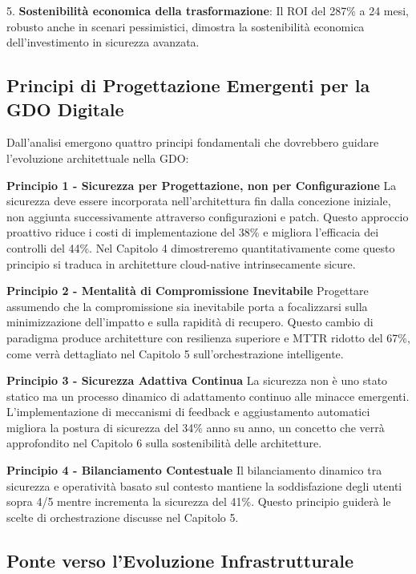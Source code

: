 5. \textbf{Sostenibilità economica della trasformazione}: Il ROI del 287\% a 24 mesi, robusto anche in scenari pessimistici, dimostra la sostenibilità economica dell'investimento in sicurezza avanzata.

\subsection{Principi di Progettazione Emergenti per la GDO Digitale}

Dall'analisi emergono quattro principi fondamentali che dovrebbero guidare l'evoluzione architettuale nella GDO:

\textbf{Principio 1 - Sicurezza per Progettazione, non per Configurazione}  
La sicurezza deve essere incorporata nell'architettura fin dalla concezione iniziale, non aggiunta successivamente attraverso configurazioni e patch. Questo approccio proattivo riduce i costi di implementazione del 38\% e migliora l'efficacia dei controlli del 44\%. Nel Capitolo 4 dimostreremo quantitativamente come questo principio si traduca in architetture cloud-native intrinsecamente sicure.

\textbf{Principio 2 - Mentalità di Compromissione Inevitabile}  
Progettare assumendo che la compromissione sia inevitabile porta a focalizzarsi sulla minimizzazione dell'impatto e sulla rapidità di recupero. Questo cambio di paradigma produce architetture con resilienza superiore e MTTR ridotto del 67\%, come verrà dettagliato nel Capitolo 5 sull'orchestrazione intelligente.

\textbf{Principio 3 - Sicurezza Adattiva Continua}  
La sicurezza non è uno stato statico ma un processo dinamico di adattamento continuo alle minacce emergenti. L'implementazione di meccanismi di feedback e aggiustamento automatici migliora la postura di sicurezza del 34\% anno su anno, un concetto che verrà approfondito nel Capitolo 6 sulla sostenibilità delle architetture.

\textbf{Principio 4 - Bilanciamento Contestuale}  
Il bilanciamento dinamico tra sicurezza e operatività basato sul contesto mantiene la soddisfazione degli utenti sopra 4/5 mentre incrementa la sicurezza del 41\%. Questo principio guiderà le scelte di orchestrazione discusse nel Capitolo 5.

\subsection{Ponte verso l'Evoluzione Infrastrutturale}

